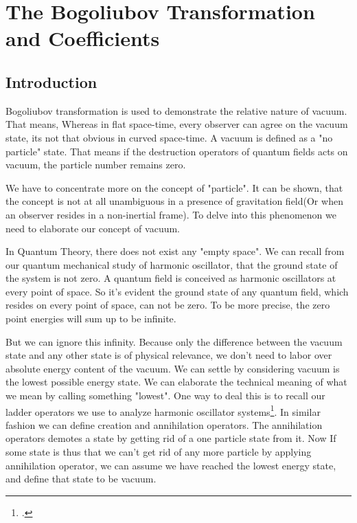 \chapter{The Bogoliubov Transformation and Coefficients}

\section{Introduction}
Bogoliubov transformation\autocite[][(p22)]{carroll:2004} is used to demonstrate the relative nature of vacuum. That means, Whereas in flat space-time, every observer can agree on the vacuum state, its not that obvious in curved space-time. A vacuum is defined as a "no particle" state. That means if the destruction operators of quantum fields acts on vacuum, the particle number remains zero. 

We have to concentrate more on the concept of "particle". It can be shown, that the concept is not at all unambiguous in a presence of gravitation field(Or when an observer resides in a non-inertial frame). To delve into this phenomenon we need to elaborate our concept of vacuum.

In Quantum Theory, there does not exist any "empty space". We can recall from our quantum mechanical study of harmonic oscillator, that the ground state of the system is not zero. A quantum field is conceived as harmonic oscillators at every point of space. So it's evident the ground state of any quantum field, which resides on every point of space, can not be zero. To be more precise, the zero point energies will sum up to be infinite.\autocite[See Chapter 3 of ][]{srednicki:2007}

But we can ignore this infinity. Because only the difference between the vacuum state and any other state is of physical relevance, we don't need to labor over absolute energy content of the vacuum. We can settle by considering vacuum is the lowest  possible energy state. We can elaborate the technical meaning of what we mean by calling something "lowest". One way to deal this is to recall our ladder operators we use to analyze harmonic oscillator systems\footcite{dirac:1958}. In similar fashion we can define creation and annihilation operators. The annihilation operators demotes a state by getting rid of a one particle state from it. Now If some state is thus that we can't get rid of any more particle by applying annihilation operator, we can assume we have reached the lowest energy state, and define that state to be vacuum.

